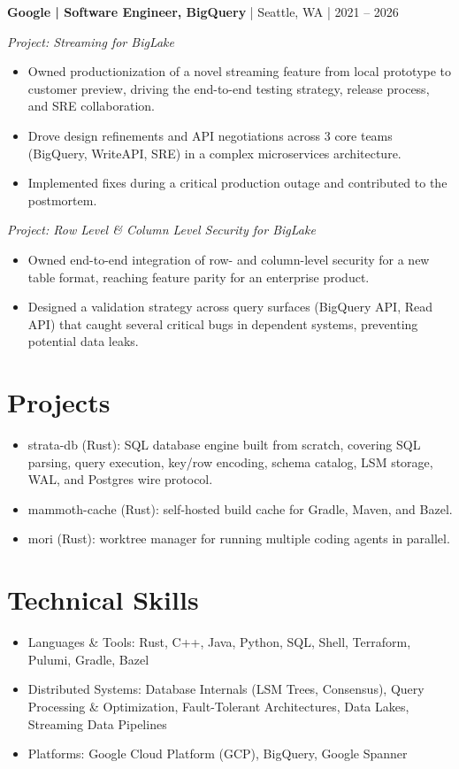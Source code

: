 \documentclass[letterpaper,11pt]{article}
\newcommand{\job}[4]{%
  \vspace{4pt}\textbf{#1 | #2} | #3 | #4\par\vspace{3pt}}
\newcommand{\subline}[1]{\textit{#1}\par}
\begin{document}
\job{Google}{Software Engineer, BigQuery}{Seattle, WA}{2021 -- 2026}
\subline{Project: Streaming for BigLake}
\begin{itemize}
  \item Owned productionization of a novel streaming feature from local prototype to customer preview, driving the end-to-end testing strategy, release process, and SRE collaboration.
  \item Drove design refinements and API negotiations across 3 core teams (BigQuery, WriteAPI, SRE) in a complex microservices architecture.
  \item Implemented fixes during a critical production outage and contributed to the postmortem.
\end{itemize}
\subline{Project: Row Level \& Column Level Security for BigLake}
\begin{itemize}
  \item Owned end-to-end integration of row- and column-level security for a new table format, reaching feature parity for an enterprise product.
  \item Designed a validation strategy across query surfaces (BigQuery API, Read API) that caught several critical bugs in dependent systems, preventing potential data leaks.
\end{itemize}

\clearpage

\section{Projects}
\begin{itemize}
  \item strata-db (Rust): SQL database engine built from scratch, covering SQL parsing, query execution, key/row encoding, schema catalog, LSM storage, WAL, and Postgres wire protocol.
  \item mammoth-cache (Rust): self-hosted build cache for Gradle, Maven, and Bazel.
  \item mori (Rust): worktree manager for running multiple coding agents in parallel.
\end{itemize}

\section{Technical Skills}
\begin{itemize}
  \item Languages \& Tools: Rust, C++, Java, Python, SQL, Shell, Terraform, Pulumi, Gradle, Bazel
  \item Distributed Systems: Database Internals (LSM Trees, Consensus), Query Processing \& Optimization, Fault-Tolerant Architectures, Data Lakes, Streaming Data Pipelines
  \item Platforms: Google Cloud Platform (GCP), BigQuery, Google Spanner
\end{itemize}
\end{document}
